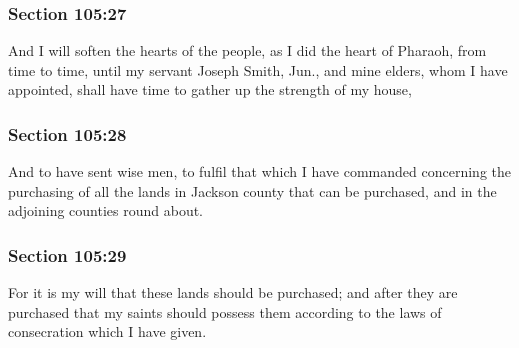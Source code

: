 	\subsubsection{Section 105:27} %
		\label{DC105-27}

		And I will soften the hearts of the people, as I did the heart of Pharaoh, from time to time, until my servant Joseph Smith, Jun., and mine elders, whom I have appointed, shall have time to gather up the strength of my house,


	\subsubsection{Section 105:28} %
		\label{DC105-28}

		And to have sent wise men, to fulfil that which I have commanded concerning the purchasing of all the lands in Jackson county that can be purchased, and in the adjoining counties round about.


	\subsubsection{Section 105:29} %
		\label{DC105-29}

		For it is my will that these lands should be purchased; and after they are purchased that my saints should possess them according to the laws of consecration which I have given.


